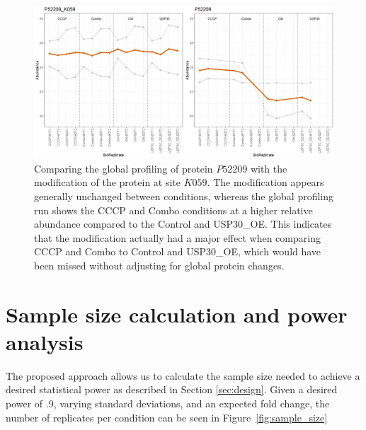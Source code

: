 \documentclass{mcp}
\def\sfigref#1{{Figure~\ref{#1}}}
\begin{document}
\begin{figure}[h!]
\centering
\includegraphics[width=\textwidth]{sim_new/USP30_profile_plot}
\caption{Comparing the global profiling of protein $P52209$ with the modification of the protein at site $K059$. The modification appears generally unchanged between conditions, whereas the global profiling run shows the CCCP and Combo conditions at a higher relative abundance compared to the Control and USP30\_OE. This indicates that the modification actually had a major effect when comparing CCCP and Combo to Control and USP30\_OE, which would have been missed without adjusting for global protein changes.}
\label{fig:USP30_profile_plot}
\end{figure}
\clearpage
\section{Sample size calculation and power analysis}

The proposed approach allows us to calculate the sample size needed to achieve a desired statistical power as described in Section \ref{sec:design}. Given a desired power of .9, varying standard deviations, and an expected fold change, the number of replicates per condition can be seen in \sfigref{fig:sample_size}
\end{document}
